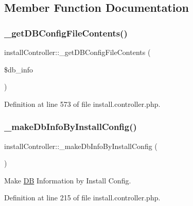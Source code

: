\subsection{Member Function Documentation}
\hypertarget{classinstallController_a49b453dda367ff1ce7ef2455974f36a5}{}\label{classinstallController_a49b453dda367ff1ce7ef2455974f36a5} 
\subsubsection{\texorpdfstring{\+\_\+get\+D\+B\+Config\+File\+Contents()}{\_getDBConfigFileContents()}}
{\footnotesize\ttfamily install\+Controller\+::\+\_\+get\+D\+B\+Config\+File\+Contents (\begin{DoxyParamCaption}\item[{}]{\$db\+\_\+info }\end{DoxyParamCaption})}



Definition at line 573 of file install.\+controller.\+php.

\hypertarget{classinstallController_aa6f541715f9abe418e14f47d9e6fa789}{}\label{classinstallController_aa6f541715f9abe418e14f47d9e6fa789} 
\subsubsection{\texorpdfstring{\+\_\+make\+Db\+Info\+By\+Install\+Config()}{\_makeDbInfoByInstallConfig()}}
{\footnotesize\ttfamily install\+Controller\+::\+\_\+make\+Db\+Info\+By\+Install\+Config (\begin{DoxyParamCaption}{ }\end{DoxyParamCaption})}



Make \hyperlink{classDB}{DB} Information by Install Config. 



Definition at line 215 of file install.\+controller.\+php.

\hypertarget{classinstallController_a159bf71d02aad0ae607b2acc71b10618}{}\label{classinstallController_a159bf71d02aad0ae607b2acc71b10618} 
